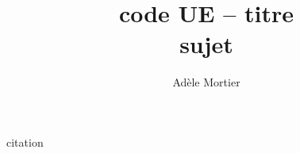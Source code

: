 \documentclass[a4paper,10pt]{article}
\title{code UE -- titre\\
	 sujet}
\author{Adèle Mortier}
\begin{document}
\maketitle
\nocite{*}


\begin{center}
	\footnotesize
	\begin{minipage}{0.7\textwidth}
		citation
	\end{minipage}
\end{center}
\medskip


\end{document}
